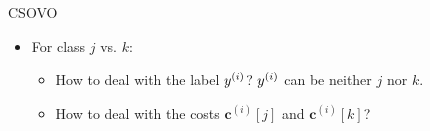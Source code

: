 \documentclass[11pt,compress,t,notes=noshow, xcolor=table]{beamer}
\newcommand{\cv}{\mathbf{c}}    %
\begin{document}
\begin{vbframe}{CSOVO \href{https://proceedings.mlr.press/v39/lin14.pdf}{}}
\begin{itemize}
        \vspace{5pt}
        
        \item For class $j$ vs. $k$:
        \begin{itemize}
            \item How to deal with the label $y^{(i)}$? $y^{(i)}$ can be neither $j$ nor $k$.
            \vspace{5pt}
            
            \item How to deal with the costs $\cv^{(i)}[j]$ and $\cv^{(i)}[k]$?
            
        \end{itemize}
            
    \end{itemize}

\end{vbframe}
\end{document}
